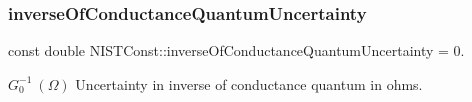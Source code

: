 \subsubsection{\texorpdfstring{inverse\+Of\+Conductance\+Quantum\+Uncertainty}{inverseOfConductanceQuantumUncertainty}}
{\footnotesize\ttfamily const double N\+I\+S\+T\+Const\+::inverse\+Of\+Conductance\+Quantum\+Uncertainty = 0.}

$G_0^{-1} \ (\Omega)$ Uncertainty in inverse of conductance quantum in ohms. 